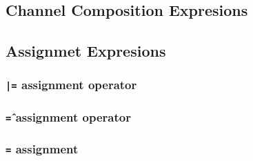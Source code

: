 \subsection{Channel Composition Expresions}

\subsection{Assignmet Expresions}
\label{ssec:assignment}

\subsubsection{\texttt{|=} assignment operator}

\subsubsection{\texttt{\^=} assignment operator}

\subsubsection{\texttt{=} assignment}

